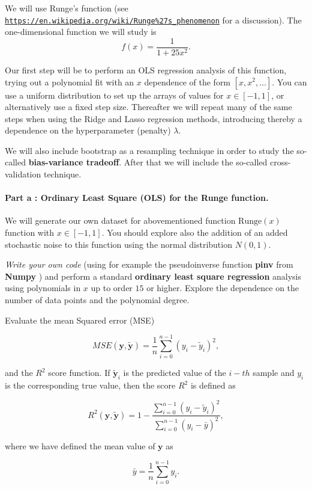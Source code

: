 \documentclass[%
oneside,                 %
final,                   %
10pt]{article}
\begin{document}
We will use Runge's function (see \href{{https://en.wikipedia.org/wiki/Runge%
\[
f(x) = \frac{1}{1+25x^2}.
\]

Our first step will be to perform an OLS regression analysis of this
function, trying out a polynomial fit with an $x$ dependence of the
form $[x,x^2,\dots]$.  You can use a uniform distribution to set up the
arrays of values for $x \in [-1,1]$, or alternatively use a fixed step size.
Thereafter we will repeat many of the same steps when using the Ridge and Lasso regression methods,
introducing thereby a dependence on the hyperparameter  (penalty) $\lambda$.

We will also include bootstrap as a resampling technique in order to
study the so-called \textbf{bias-variance tradeoff}.  After that we will
include the so-called cross-validation technique.

\paragraph{Part a : Ordinary Least Square (OLS) for the Runge function.}
We will generate our own dataset for abovementioned  function
$\mathrm{Runge}(x)$ function with $x\in [-1,1]$. You should explore also the addition
of an added stochastic noise to this function using the normal
distribution $N(0,1)$.

\emph{Write your own code} (using for example the  pseudoinverse function \textbf{pinv} from  \textbf{Numpy} ) and perform a standard \textbf{ordinary least square regression}
analysis using polynomials in $x$ up to  order $15$ or higher. Explore the dependence on the number of data points and the polynomial degree.

Evaluate the mean Squared error (MSE)

\[ MSE(\bm{y},\tilde{\bm{y}}) = \frac{1}{n}
\sum_{i=0}^{n-1}(y_i-\tilde{y}_i)^2, 
\] 

and the $R^2$ score function.  If $\tilde{\bm{y}}_i$ is the predicted
value of the $i-th$ sample and $y_i$ is the corresponding true value,
then the score $R^2$ is defined as

\[
R^2(\bm{y}, \tilde{\bm{y}}) = 1 - \frac{\sum_{i=0}^{n - 1} (y_i - \tilde{y}_i)^2}{\sum_{i=0}^{n - 1} (y_i - \bar{y})^2},
\]

where we have defined the mean value  of $\bm{y}$ as

\[
\bar{y} =  \frac{1}{n} \sum_{i=0}^{n - 1} y_i.
\]
\end{document}
